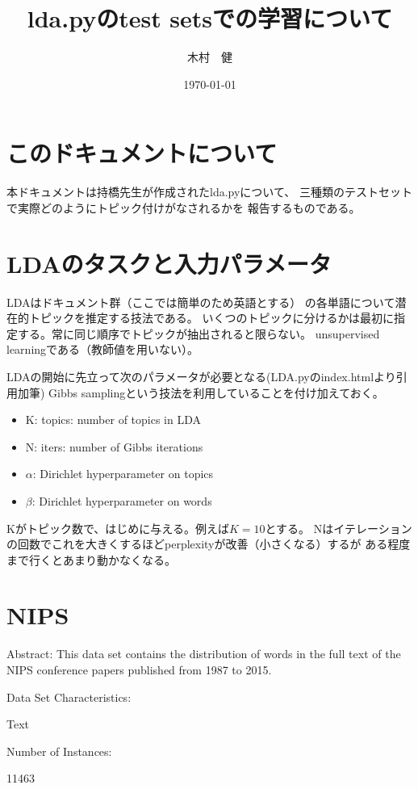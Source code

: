 \documentclass[uplatex,dvipdfmx]{jsarticle}
\begin{document}
\title{\huge lda.pyのtest setsでの学習について}
\author{木村　健}
\date{\today}
\maketitle


\section{このドキュメントについて}
本ドキュメントは持橋先生が作成されたlda.pyについて、
三種類のテストセットで実際どのようにトピック付けがなされるかを
報告するものである。

\section{LDAのタスクと入力パラメータ}
LDA\cite{blei}はドキュメント群（ここでは簡単のため英語とする）
の各単語について潜在的トピックを推定する技法である。
いくつのトピックに分けるかは最初に指定する。常に同じ順序でトピックが抽出されると限らない。
unsupervised learningである（教師値を用いない）。

LDAの開始に先立って次のパラメータが必要となる(LDA.pyのindex.htmlより引用加筆)
Gibbs samplingという技法を利用していることを付け加えておく。

\begin{itemize}
\item K: topics: number of topics in LDA
\item N: iters: number of Gibbs iterations
\item $\alpha$: Dirichlet hyperparameter on topics
\item $\beta$: Dirichlet hyperparameter on words
\end{itemize}

Kがトピック数で、はじめに与える。例えば$K=10$とする。
Nはイテレーションの回数でこれを大きくするほどperplexityが改善（小さくなる）するが
ある程度まで行くとあまり動かなくなる。

\section{NIPS}
Abstract: This data set contains the distribution of words in the full text of the NIPS conference papers published from 1987 to 2015.

Data Set Characteristics:  

Text

Number of Instances:

11463
\end{document}
